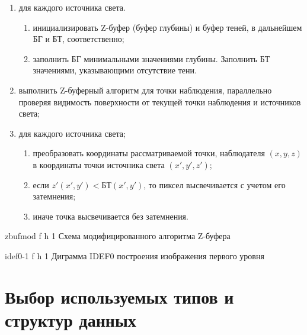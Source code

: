 \begin{enumerate}
	\item для каждого источника света.
	
	\begin{enumerate}[label=\arabic{enumi}.\arabic*]
		\item инициализировать Z-буфер (буфер глубины)  и буфер теней, в дальнейшем БГ и БТ, соответственно;
		\item заполнить БГ минимальными значениями глубины.
		Заполнить БТ значениями, указывающими отсутствие тени.
	\end{enumerate}
	
	\item выполнить Z-буферный алгоритм для точки наблюдения, параллельно проверяя видимость поверхности от текущей точки наблюдения и источников света;
	\item для каждого источника света;
	
	\begin{enumerate}[label=\arabic{enumi}.\arabic*]
		\item преобразовать координаты рассматриваемой точки, наблюдателя $(x, y, z)$ в координаты точки источника света $(x', y', z')$;
		\item если $z'(x', y') < БТ(x', y')$, то пиксел высвечивается с учетом его затемнения;
		\item  иначе точка высвечивается без затемнения.
	\end{enumerate}
	
	
\end{enumerate}
\fi

	{zbufmod} %
	{f} %
	{h} %
	{1\textwidth} %
	{Схема модифицированного алгоритма Z-буфера} %

\clearpage


	{idef0-1} %
	{f} %
	{h} %
	{1\textwidth} %
	{Диграмма IDEF0 построения изображения первого уровня} %




\section{Выбор используемых типов и структур данных}

